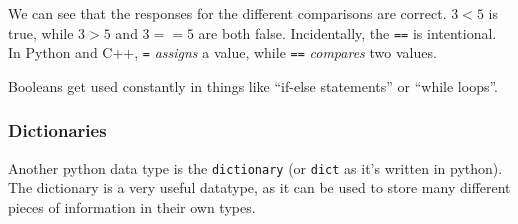     We can see that the responses for the different comparisons are correct.
\(3 < 5\) is true, while \(3 > 5\) and \(3 == 5\) are both false.
Incidentally, the \texttt{==} is intentional. In Python and C++,
\texttt{=} \emph{assigns} a value, while \texttt{==} \emph{compares} two
values.

Booleans get used constantly in things like ``if-else statements'' or
``while loops''.

\hypertarget{dictionaries}{%
\subsubsection{Dictionaries}\label{dictionaries}}

Another python data type is the \texttt{dictionary} (or \texttt{dict} as
it's written in python). The dictionary is a very useful datatype, as it
can be used to store many different pieces of information in their own
types.

